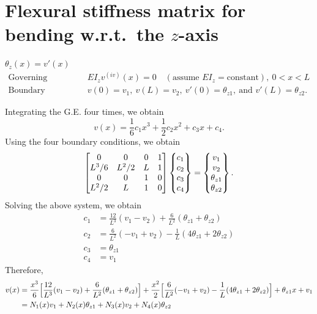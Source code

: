 \section{Flexural stiffness matrix for bending w.r.t.\ the \texorpdfstring{$z$}{z}-axis}
$\theta_z(x) = v'(x)$
\begin{align*}
  \text{Governing equation (G.E.):}&\quad EI_z v^{(iv)}(x) = 0\quad(\text{assume } EI_z = \text{constant}),\ 0 < x < L\\
  \text{Boundary conditions (BCs):}&\quad v(0) = v_1,\ v(L) = v_2,\ v'(0) = \theta_{z1},\ \text{and } v'(L) = \theta_{z2}.
\end{align*}
\begin{fig}
  
\end{fig}
Integrating the G.E. four times, we obtain
\begin{equation}
  v(x) = \frac16 c_1x^3 + \frac12 c_2x^2 + c_3x + c_4.
\end{equation}
Using the four boundary conditions, we obtain
\begin{equation}
  \begin{bmatrix}0 & 0 & 0 & 1\\ L^3/6 & L^2/2 & L & 1\\ 0 & 0 & 1 & 0\\ L^2/2 & L & 1 & 0\end{bmatrix}\begin{Bmatrix}c_1\\ c_2\\ c_3\\ c_4\end{Bmatrix} = \begin{Bmatrix}v_1\\ v_2\\ \theta_{z1}\\ \theta_{z2}\end{Bmatrix}.
\end{equation}
Solving the above system, we obtain
\begin{align*}
  c_1 &= \frac{12}{L^3}(v_1-v_2) + \frac{6}{L^2}(\theta_{z1}+\theta_{z2})\\
  c_2 &= \frac{6}{L^2}(-v_1+v_2) - \frac1L(4\theta_{z1}+2\theta_{z2})\\
  c_3 &= \theta_{z1}\\
  c_4 &= v_1
\end{align*}
Therefore,
\begin{equation}
  \begin{aligned}
    v(x) &= \frac{x^3}{6}\Bigl[\frac{12}{L^3}(v_1-v_2)+\frac{6}{L^2}(\theta_{z1}+\theta_{z2})\Bigr]
          + \frac{x^2}{2}\Bigl[\frac{6}{L^2}(-v_1+v_2)-\frac1L(4\theta_{z1}+2\theta_{z2})\Bigr] + \theta_{z1}x + v_1\\
         &= N_1(x)v_1 + N_2(x)\theta_{z1} + N_3(x)v_2 + N_4(x)\theta_{z2}
  \end{aligned}
\end{equation}

